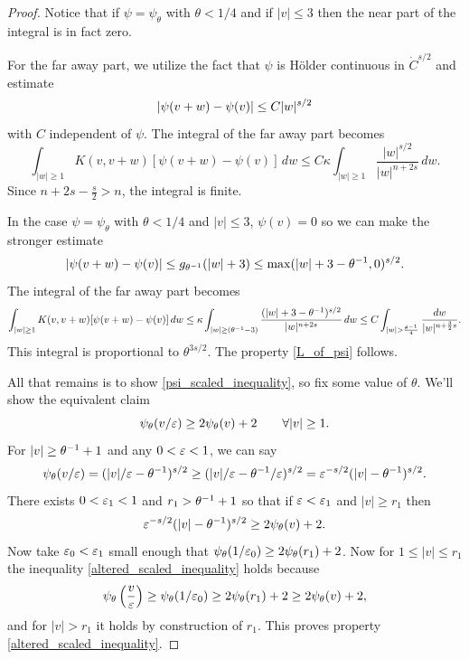 \begin{proof}
Notice that if $\psi = \psi_\theta$ with $\theta < 1/4$ and if $|v|\leq 3$ then the near part of the integral is in fact zero.  

For the far away part, we utilize the fact that $\psi$ is H\"{o}lder continuous in $\dot{C}^{s/2}$ and estimate 
\[ \left\lvert \psi(v+w) - \psi(v) \right\rvert \leq C|w|^{s/2} \]
with $C$ independent of $\psi$.  
The integral of the far away part becomes
\[ \int_{|w|\geq 1} K(v,v+w)[\psi(v+w)-\psi(v)] \,dw \leq C \kappa \int_{|w|\geq 1} \frac{|w|^{s/2}}{|w|^{n+2s}} \,dw. \]
Since  $n+2s-\frac{s}{2} > n$, the integral is finite.  

In the case $\psi = \psi_\theta$ with $\theta < 1/4$ and $|v|\leq 3$, $\psi(v)=0$ so we can make the stronger estimate 
\[ \left\lvert \psi(v+w) - \psi(v) \right\rvert \leq g_{\theta^{-1}}(|w| + 3) \leq \max(|w|+3-\theta^{-1},0)^{s/2}. \]
The integral of the far away part becomes
\[ \int_{|w|\geq 1} K(v,v+w)[\psi(v+w)-\psi(v)] \,dw \leq  \kappa \int_{|w|\geq \left( \theta^{-1}-3 \right)} \frac{(|w|+3-\theta^{-1})^{s/2}}{|w|^{n+2s}} \,dw \leq C \int_{|w| > \frac{\theta^{-1}}{4}} \frac{dw}{|w|^{n+\frac{3}{2}s}}. \]
This integral is proportional to $\theta^{3s/2}$.  The property \eqref{L_of_psi} follows.  

All that remains is to show \eqref{psi_scaled_inequality}, so fix some value of $\theta$.  We'll show the equivalent claim 
\begin{equation}\label{altered_scaled_inequality}
\psi_\theta(v/\varepsilon) \geq 2 \psi_\theta(v) + 2 \qquad \forall |v| \geq 1. 
\end{equation}
For $|v| \geq \theta^{-1}+1$ and any $0 < \varepsilon < 1$, we can say 
\[ \psi_\theta(v/\varepsilon) = (|v|/\varepsilon-\theta^{-1})^{s/2} \geq (|v|/\varepsilon - \theta^{-1}/\varepsilon)^{s/2} = \varepsilon^{-s/2} (|v| - \theta^{-1})^{s/2}. \]
There exists $0 < \varepsilon_1 < 1$ and $r_1 > \theta^{-1}+1$ so that if $\varepsilon < \varepsilon_1$ and $|v| \geq r_1$ then
\[ \varepsilon^{-s/2} (|v| - \theta^{-1})^{s/2} \geq 2 \psi_\theta(v) + 2. \]
Now take $\varepsilon_0 < \varepsilon_1$ small enough that $\psi_\theta(1/\varepsilon_0) \geq 2 \psi_\theta(r_1) + 2$.  Now for $1 \leq |v| \leq r_1$ the inequality \eqref{altered_scaled_inequality} holds because
\[ \psi_\theta\left( \frac{v}{\varepsilon} \right) \geq \psi_\theta(1/\varepsilon_0) \geq 2 \psi_\theta(r_1) + 2 \geq 2 \psi_\theta(v) + 2, \]
and for $|v| > r_1$ it holds by construction of $r_1$.  This proves property \eqref{altered_scaled_inequality}.  
\end{proof}





